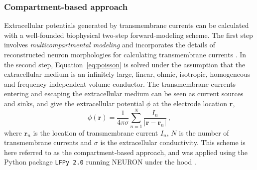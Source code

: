 \documentclass[preprint,10pt,authoryear]{elsarticle}
\begin{document}
\subsubsection{Compartment-based approach}\label{subsubsec:multicomp}
Extracellular potentials generated by transmembrane currents can be calculated with a well-founded biophysical two-step forward-modeling scheme. The first step involves \textit{multicompartmental modeling} and incorporates the details of reconstructed neuron morphologies for calculating transmembrane currents \citep{STERRATT2011}. In the second step, Equation~\eqref{eq:poisson} is solved under the assumption that the extracellular medium is an infinitely large, linear, ohmic, isotropic, homogeneous and frequency-independent volume conductor. The transmembrane currents entering and escaping the extracellular medium can be seen as current sources and sinks, and give the extracellular potential $\phi$ at the electrode location $\mathbf{r}$,
\begin{equation}
\phi(\mathbf{r}) = \frac{1}{4 \pi \sigma}\sum_{n=1}^N \frac{I_n}{|\mathbf{r} - \mathbf{r}_n|}~,
\label{eq:point_source}
\end{equation}
where $\mathbf{r}_n$ is the location of transmembrane current $I_n$, $N$ is the number of transmembrane currents and $\sigma$ is the extracellular conductivity. 
This scheme is here referred to as the compartment-based approach, and was applied using the Python package \texttt{LFPy 2.0} running NEURON under the hood \citep{HAGEN2018,CARNEVALE2006}.
\end{document}
